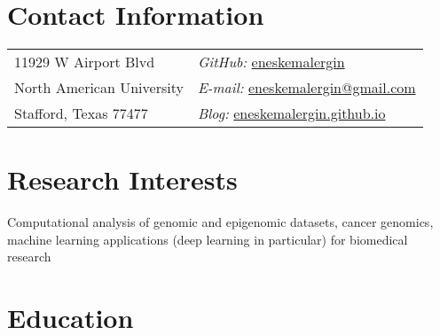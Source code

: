 \documentclass[margin,line]{res}
\newenvironment{list1}{
  \begin{list}{\ding{113}}{%
      \setlength{\itemsep}{0in}
      \setlength{\parsep}{0in} \setlength{\parskip}{0in}
      \setlength{\topsep}{0in} \setlength{\partopsep}{0in} 
      \setlength{\leftmargin}{0.17in}}}{\end{list}}
\newenvironment{list2}{
  \begin{list}{$\bullet$}{%
      \setlength{\itemsep}{0in}
      \setlength{\parsep}{0in} \setlength{\parskip}{0in}
      \setlength{\topsep}{0in} \setlength{\partopsep}{0in} 
      \setlength{\leftmargin}{0.2in}}}{\end{list}}
\begin{document}

\begin{resume}
\section{\sc Contact Information}
\vspace{.05in}
\begin{tabular}{@{}p{2in}p{4in}}
11929 W Airport Blvd         & \hfill {\it GitHub:}  \href{https://github.com/eneskemalergin}{eneskemalergin} \\
North American University    & \hfill {\it E-mail:}  \href{mailto:eneskemalergin@gmail.com}{eneskemalergin@gmail.com}\\
Stafford, Texas 77477        & \hfill {\it Blog:}  \href{eneskemalergin.github.io}{eneskemalergin.github.io} \\
\end{tabular}


\section{\sc Research Interests}
Computational analysis of genomic and epigenomic datasets, cancer genomics, machine learning applications (deep learning in particular) for biomedical research

\section{\sc Education}

%


\end{resume}
\end{document}
